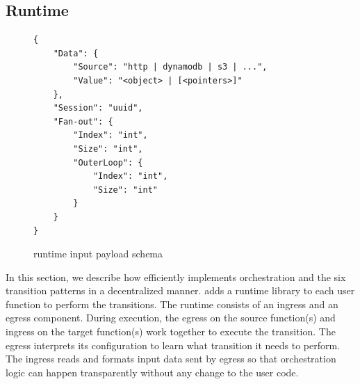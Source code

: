 \subsection{\name{} Runtime}\label{sec:runtime}


\begin{figure}[]
    \begin{verbatim}
{
    "Data": {
        "Source": "http | dynamodb | s3 | ...",
        "Value": "<object> | [<pointers>]"
    },
    "Session": "uuid",
    "Fan-out": {
        "Index": "int",
        "Size": "int",
        "OuterLoop": {
            "Index": "int",
            "Size": "int"
        }
    }
}
    \end{verbatim}
    \caption{\name{} runtime input payload schema}
    \label{fig:input-format}
\end{figure}


In this section, we describe how \name{} efficiently implements orchestration
and the six transition patterns in a decentralized manner. \name{} adds a
runtime library to each  user function to perform the transitions. The \name{}
runtime consists of an ingress and an egress component. During execution, the
egress on the source function(s) and ingress on the target function(s) work
together to execute the transition. The egress interprets its \name{}
configuration to learn what transition it needs to perform. The ingress reads
and formats input data sent by egress so that
\name{} orchestration logic can happen transparently without any change to the
user code.

